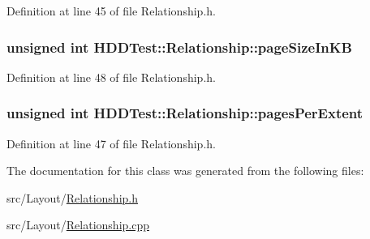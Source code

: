 Definition at line 45 of file Relationship.\-h.

\hypertarget{class_h_d_d_test_1_1_relationship_ac986788af3ce964e514a737645aa6cd1}{
\subsubsection[{page\-Size\-In\-K\-B}]{\setlength{\rightskip}{0pt plus 5cm}unsigned int H\-D\-D\-Test\-::\-Relationship\-::page\-Size\-In\-K\-B}}\label{class_h_d_d_test_1_1_relationship_ac986788af3ce964e514a737645aa6cd1}


Definition at line 48 of file Relationship.\-h.

\hypertarget{class_h_d_d_test_1_1_relationship_ada41b15d153b3baa5788de2a66295bcb}{
\subsubsection[{pages\-Per\-Extent}]{\setlength{\rightskip}{0pt plus 5cm}unsigned int H\-D\-D\-Test\-::\-Relationship\-::pages\-Per\-Extent}}\label{class_h_d_d_test_1_1_relationship_ada41b15d153b3baa5788de2a66295bcb}


Definition at line 47 of file Relationship.\-h.



The documentation for this class was generated from the following files\-:\begin{DoxyCompactItemize}
\item 
src/\-Layout/\hyperlink{_relationship_8h}{Relationship.\-h}\item 
src/\-Layout/\hyperlink{_relationship_8cpp}{Relationship.\-cpp}\end{DoxyCompactItemize}
